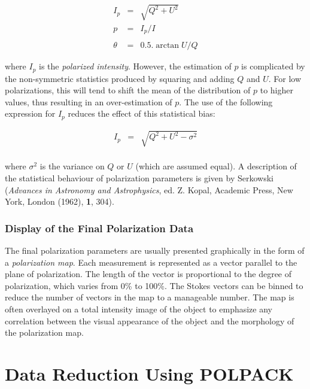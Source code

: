 \begin{myquote}
\begin{eqnarray*}
  I_{p} & = & \sqrt{ Q^{2} + U^{2} } \\
  p & = & I_{p}/I \\ \\
  \theta & = & 0.5.\arctan U/Q
\end{eqnarray*}
\end{myquote}

where $I_{p}$ is the {\em polarized intensity}. However, the estimation
of $p$ is complicated by the non-symmetric statistics produced by squaring
and adding $Q$ and $U$. For low polarizations, this will tend to shift
the mean of the distribution of $p$ to higher values, thus resulting in
an over-estimation of $p$. The use of the following expression for $I_{p}$
reduces the effect of this statistical bias:

\begin{myquote}
\begin{eqnarray*}
  I_{p} & = & \sqrt{ Q^{2} + U^{2} - \sigma^{2}} \\
\end{eqnarray*}
\end{myquote}

where $\sigma^{2}$ is the variance on $Q$ or $U$ (which are assumed
equal). A description of the statistical behaviour of polarization
parameters is given by Serkowski ({\em Advances in Astronomy and
Astrophysics}, ed. Z. Kopal, Academic Press, New York, London (1962),
{\bf 1}, 304).

\subsubsection{Display of the Final Polarization Data}
The final polarization parameters are usually presented graphically in
the form of a {\em polarization map}. Each measurement is represented as
a vector parallel to the plane of polarization. The length of the vector
is proportional to the degree of polarization, which varies from 0\% to
100\%. The Stokes vectors can be binned to reduce the number of vectors
in the map to a manageable number. The map is often overlayed on a total
intensity image of the object to emphasize any correlation between the
visual appearance of the object and the morphology of the polarization
map.

\section{Data Reduction Using POLPACK}


